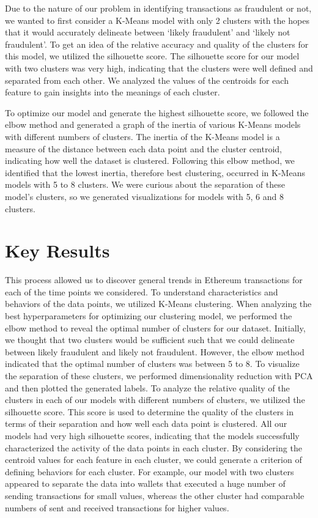 \documentclass[sigconf]{acmart}
\begin{document}
Due to the nature of our problem in identifying transactions as fraudulent or not, we wanted to first consider a K-Means model with only 2 clusters with the hopes that it would accurately delineate between ‘likely fraudulent’ and ‘likely not fraudulent’. To get an idea of the relative accuracy and quality of the clusters for this model, we utilized the silhouette score. The silhouette score for our model with two clusters was very high, indicating that the clusters were well defined and separated from each other. We analyzed the values of the centroids for each feature to gain insights into the meanings of each cluster.  

To optimize our model and generate the highest silhouette score, we followed the elbow method and generated a graph of the inertia of various K-Means models with different numbers of clusters. The inertia of the K-Means model is a measure of the distance between each data point and the cluster centroid, indicating how well the dataset is clustered. Following this elbow method, we identified that the lowest inertia, therefore best clustering, occurred in K-Means models with 5 to 8 clusters. We were curious about the separation of these model’s clusters, so we generated visualizations for models with 5, 6 and 8 clusters.  

\section{Key Results}

This process allowed us to discover general trends in Ethereum transactions for each of the time points we considered. To understand characteristics and behaviors of the data points, we utilized K-Means clustering. When analyzing the best hyperparameters for optimizing our clustering model, we performed the elbow method to reveal the optimal number of clusters for our dataset. Initially, we thought that two clusters would be sufficient such that we could delineate between likely fraudulent and likely not fraudulent. However, the elbow method indicated that the optimal number of clusters was between 5 to 8. To visualize the separation of these clusters, we performed dimensionality reduction with PCA and then plotted the generated labels. To analyze the relative quality of the clusters in each of our models with different numbers of clusters, we utilized the silhouette score. This score is used to determine the quality of the clusters in terms of their separation and how well each data point is clustered. All our models had very high silhouette scores, indicating that the models successfully characterized the activity of the data points in each cluster. By considering the centroid values for each feature in each cluster, we could generate a criterion of defining behaviors for each cluster. For example, our model with two clusters appeared to separate the data into wallets that executed a huge number of sending transactions for small values, whereas the other cluster had comparable numbers of sent and received transactions for higher values. 
\end{document}
